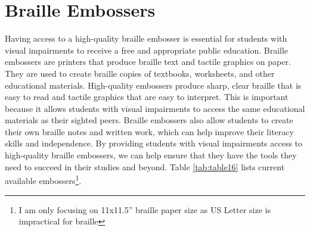 \pagebreak\hypertarget{embossers}{}\section{Braille Embossers}\label{embossers}
Having access to a high-quality braille embosser is essential for students with visual impairments to receive a free and appropriate public education. Braille embossers are printers that produce braille text and tactile graphics on paper. They are used to create braille copies of textbooks, worksheets, and other educational materials. High-quality embossers produce sharp, clear braille that is easy to read and tactile graphics that are easy to interpret. This is important because it allows students with visual impairments to access the same educational materials as their sighted peers. Braille embossers also allow students to create their own braille notes and written work, which can help improve their literacy skills and independence. By providing students with visual impairments access to high-quality braille embossers, we can help ensure that they have the tools they need to succeed in their studies and beyond. Table \ref{tab:table16} lists current available embossers\footnote{\raggedright I am only focusing on 11x11.5'' braille paper size as US Letter size is impractical for braille}.

\pagebreak 
 
